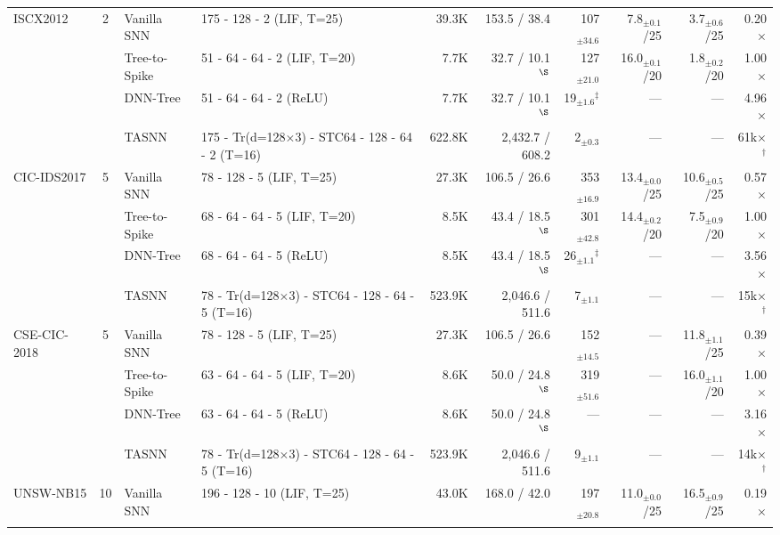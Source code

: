 \begin{table}[!ht]
{\begin{tabular}{l c l l r r r r r r}
\midrule
\multirow{4}{*}{ISCX2012} & \multirow{4}{*}{2}
  & Vanilla SNN   & 175 - 128 - 2 (LIF, T=25) & 39.3K & 153.5 / 38.4 & 107$_{\pm34.6}$ & 7.8$_{\pm0.1}$/25 & 3.7$_{\pm0.6}$/25 & 0.20$\times$ \\
& & Tree-to-Spike & 51 - 64 - 64 - 2 (LIF, T=20) & 7.7K & 32.7 / 10.1$^{\S}$ & 127$_{\pm21.0}$ & 16.0$_{\pm0.1}$/20 & 1.8$_{\pm0.2}$/20 & 1.00$\times$ \\
& & DNN-Tree      & 51 - 64 - 64 - 2 (ReLU) & 7.7K & 32.7 / 10.1$^{\S}$ & 19$_{\pm1.6}$$^\ddagger$ & --- & --- & 4.96$\times$ \\
& & TASNN         & 175 - Tr(d=128$\times$3) - STC64 - 128 - 64 - 2 (T=16) & 622.8K & 2,432.7 / 608.2 & 2$_{\pm0.3}$ & --- & --- & 61k$\times$$^\dagger$ \\
\midrule
\multirow{4}{*}{CIC-IDS2017} & \multirow{4}{*}{5}
  & Vanilla SNN   & 78 - 128 - 5 (LIF, T=25) & 27.3K & 106.5 / 26.6 & 353$_{\pm16.9}$ & 13.4$_{\pm0.0}$/25 & 10.6$_{\pm0.5}$/25 & 0.57$\times$ \\
& & Tree-to-Spike & 68 - 64 - 64 - 5 (LIF, T=20) & 8.5K & 43.4 / 18.5$^{\S}$ & 301$_{\pm42.8}$ & 14.4$_{\pm0.2}$/20 & 7.5$_{\pm0.9}$/20 & 1.00$\times$ \\
& & DNN-Tree      & 68 - 64 - 64 - 5 (ReLU) & 8.5K & 43.4 / 18.5$^{\S}$ & 26$_{\pm1.1}$$^\ddagger$ & --- & --- & 3.56$\times$ \\
& & TASNN         & 78 - Tr(d=128$\times$3) - STC64 - 128 - 64 - 5 (T=16) & 523.9K & 2,046.6 / 511.6 & 7$_{\pm1.1}$ & --- & --- & 15k$\times$$^\dagger$ \\
\midrule
\multirow{4}{*}{CSE-CIC-2018} & \multirow{4}{*}{5}
  & Vanilla SNN   & 78 - 128 - 5 (LIF, T=25) & 27.3K & 106.5 / 26.6 & 152$_{\pm14.5}$ & --- & 11.8$_{\pm1.1}$/25 & 0.39$\times$ \\
& & Tree-to-Spike & 63 - 64 - 64 - 5 (LIF, T=20) & 8.6K & 50.0 / 24.8$^{\S}$ & 319$_{\pm51.6}$ & --- & 16.0$_{\pm1.1}$/20 & 1.00$\times$ \\
& & DNN-Tree      & 63 - 64 - 64 - 5 (ReLU) & 8.6K & 50.0 / 24.8$^{\S}$ & --- & --- & --- & 3.16$\times$ \\
& & TASNN         & 78 - Tr(d=128$\times$3) - STC64 - 128 - 64 - 5 (T=16) & 523.9K & 2,046.6 / 511.6 & 9$_{\pm1.1}$ & --- & --- & 14k$\times$$^\dagger$ \\
\midrule
\multirow{4}{*}{UNSW-NB15} & \multirow{4}{*}{10}
  & Vanilla SNN   & 196 - 128 - 10 (LIF, T=25) & 43.0K & 168.0 / 42.0 & 197$_{\pm20.8}$ & 11.0$_{\pm0.0}$/25 & 16.5$_{\pm0.9}$/25 & 0.19$\times$ \\
$$
\end{tabular}}
\end{table}
